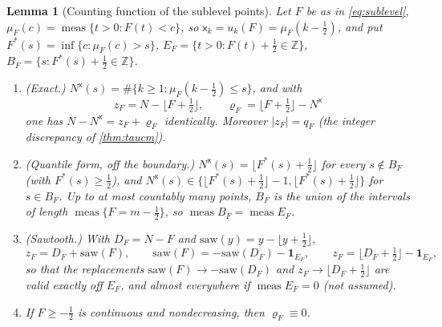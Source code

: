 \documentclass[11pt,a4paper]{article}
\numberwithin{equation}{section}
\newtheorem{lemma}[theorem]{Lemma}
\theoremstyle{definition}
\theoremstyle{remark}
\newcommand{\meas}{\operatorname{meas}}
\newcommand{\ind}{\mathbf 1}
\begin{document}
\begin{lemma}[Counting function of the sublevel points]\label{lem:v9-rearr}
Let $F$ be as in \eqref{eq:sublevel}, $\mu_F(c)=\meas\{t>0:F(t)<c\}$, so $\mathsf x_k=u_k(F)=\mu_F(k-\frac12)$, and put $F^*(s)=\inf\{c:\mu_F(c)>s\}$, $E_F=\{t>0:F(t)+\frac12\in\mathbb Z\}$, $B_F=\{s:F^*(s)+\frac12\in\mathbb Z\}$.
\begin{enumerate}[label=(\alph*),leftmargin=*]
\item \emph{(Exact.)} $N^{\mathsf x}(s)=\#\{k\ge1:\mu_F(k-\frac12)\le s\}$, and with
\begin{equation}\label{eq:v9-slip}
z_F=N-\lfloor F+\tfrac12\rfloor,\qquad \varrho_F=\lfloor F+\tfrac12\rfloor-N^{\mathsf x}
\end{equation}
one has $N-N^{\mathsf x}=z_F+\varrho_F$ identically. Moreover $|z_F|=q_F$ (the integer discrepancy of \cref{thm:taucm}).
\item \emph{(Quantile form, off the boundary.)} $N^{\mathsf x}(s)=\lfloor F^*(s)+\frac12\rfloor$ for every $s\notin B_F$ (with $F^*(s)\ge\frac12$), and $N^{\mathsf x}(s)\in\{\lfloor F^*(s)+\frac12\rfloor-1,\lfloor F^*(s)+\frac12\rfloor\}$ for $s\in B_F$. Up to at most countably many points, $B_F$ is the union of the intervals of length $\meas\{F=m-\frac12\}$, so $\meas B_F=\meas E_F$.
\item \emph{(Sawtooth.)} With $D_F=N-F$ and $\mathrm{saw}(y)=y-\lfloor y+\frac12\rfloor$,
\begin{equation}\label{eq:v9-sawD}
z_F=D_F+\mathrm{saw}(F),\qquad
\mathrm{saw}(F)=-\mathrm{saw}(D_F)-\ind_{E_F},\qquad
z_F=\lfloor D_F+\tfrac12\rfloor-\ind_{E_F},
\end{equation}
so that the replacements $\mathrm{saw}(F)\to-\mathrm{saw}(D_F)$ and $z_F\to\lfloor D_F+\frac12\rfloor$ are valid exactly off $E_F$, and almost everywhere if $\meas E_F=0$ (not assumed).
\item If $F\ge-\frac12$ is continuous and nondecreasing, then $\varrho_F\equiv0$.
\end{enumerate}
\end{lemma}
\end{document}
